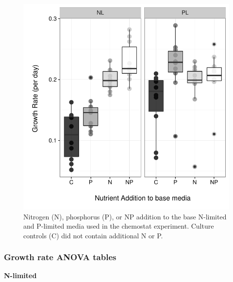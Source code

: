 \documentclass[]{article}
\begin{document}
\begin{figure}[htbp]
\centering
\includegraphics{analysis_ecoevostoich_files/figure-latex/gr-vis-1.pdf}
\caption{Nitrogen (N), phosphorus (P), or NP addition to the base
N-limited and P-limited media used in the chemostat experiment. Culture
controls (C) did not contain additional N or P.}
\end{figure}

\newpage

\subsubsection{Growth rate ANOVA tables}\label{growth-rate-anova-tables}

\textbf{N-limited}
\end{document}
